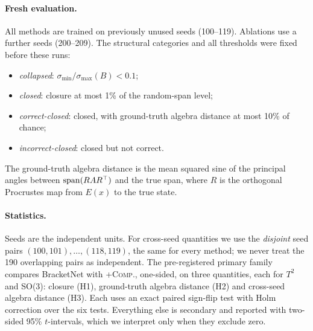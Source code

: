 \paragraph{Fresh evaluation.}
All methods are trained on \NNseeds{} previously unused seeds (100--119). Ablations use a further \NNabl{}
seeds (200--209). The structural categories and all thresholds were fixed before these runs:
\begin{itemize}
\item \emph{collapsed}: $\sigma_{\min}/\sigma_{\max}(B)<0.1$;
\item \emph{closed}: closure at most 1\% of the random-span level;
\item \emph{correct-closed}: closed, with ground-truth algebra distance at most 10\% of chance;
\item \emph{incorrect-closed}: closed but not correct.
\end{itemize}
The ground-truth algebra distance is the mean squared sine of the principal angles between
$\operatorname{span}(RA R^\top)$ and the true span, where $R$ is the orthogonal Procrustes map from $E(x)$ to the true state.

\paragraph{Statistics.}
Seeds are the independent units. For cross-seed quantities we use the \NNpairs{} \emph{disjoint} seed pairs
$(100,101),\dots,(118,119)$, the same for every method; we never treat the 190 overlapping pairs as independent.
The pre-registered primary family compares BracketNet with \textsc{+Comp.}, one-sided, on three quantities, each
for $T^2$ and SO(3): closure (H1), ground-truth algebra distance (H2) and cross-seed algebra distance (H3). Each
uses an exact paired sign-flip test with Holm correction over the six tests. Everything else is secondary and
reported with two-sided 95\% $t$-intervals, which we interpret only when they exclude zero.

